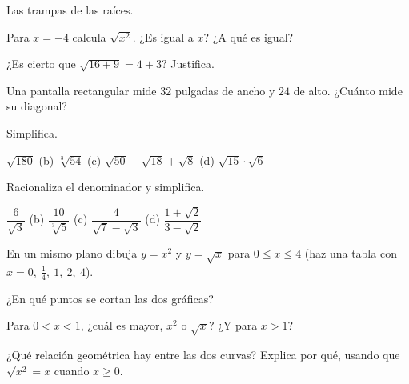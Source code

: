 \documentclass[11pt,a4paper]{article}
\begin{document}
\begin{ejercicios}
\item Las trampas de las raíces.
  \begin{ejercicios}
  \item Para $x=-4$ calcula $\sqrt{x^{2}}$. ¿Es igual a $x$? ¿A qué es igual?
  \item ¿Es cierto que $\sqrt{16+9}=4+3$? Justifica.
  \item Una pantalla rectangular mide $32$ pulgadas de ancho y $24$ de alto. ¿Cuánto mide su diagonal?
  \end{ejercicios}
\item Simplifica.
  \begin{ejercicios}
  \item $\sqrt{180}$ \quad (b) $\sqrt[3]{54}$ \quad (c) $\sqrt{50}-\sqrt{18}+\sqrt8$ \quad (d) $\sqrt{15}\cdot\sqrt6$
  \end{ejercicios}
\item Racionaliza el denominador y simplifica.
  \begin{ejercicios}
  \item $\dfrac6{\sqrt3}$ \quad (b) $\dfrac{10}{\sqrt[3]5}$ \quad (c) $\dfrac{4}{\sqrt7-\sqrt3}$ \quad (d) $\dfrac{1+\sqrt2}{3-\sqrt2}$
  \end{ejercicios}
\item En un mismo plano dibuja $y=x^{2}$ y $y=\sqrt{x}$ para $0\le x\le4$ (haz una tabla con $x=0,\ \tfrac14,\ 1,\ 2,\ 4$).
  \begin{ejercicios}
  \item ¿En qué puntos se cortan las dos gráficas?
  \item Para $0<x<1$, ¿cuál es mayor, $x^{2}$ o $\sqrt x$? ¿Y para $x>1$?
  \item ¿Qué relación geométrica hay entre las dos curvas? Explica por qué, usando que $\sqrt{x^{2}}=x$ cuando $x\ge0$.
  \end{ejercicios}
\end{ejercicios}
\end{document}
